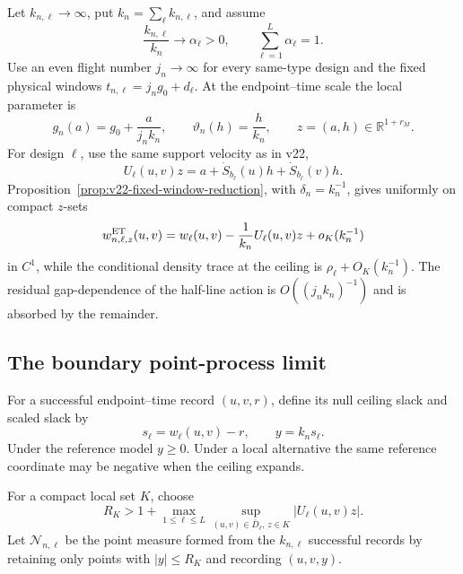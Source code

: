 Let \(k_{n,\ell}\to\infty\), put \(k_n=\sum_\ell k_{n,\ell}\), and assume
\begin{equation}\label{eq:v23-et-design-proportions}
 \frac{k_{n,\ell}}{k_n}\longrightarrow\alpha_\ell>0,
 \qquad \sum_{\ell=1}^L\alpha_\ell=1.
\end{equation}
Use an even flight number \(j_n\to\infty\) for every same-type design and the
fixed physical windows \(t_{n,\ell}=j_ng_0+d_\ell\).  At the endpoint--time
scale the local parameter is
\begin{equation}\label{eq:v23-et-local-parameter}
 g_n(a)=g_0+\frac{a}{j_nk_n},
 \qquad
 \vartheta_n(h)=\frac{h}{k_n},
 \qquad z=(a,h)\in\mathbb R^{1+r_M}.
\end{equation}
For design \(\ell\), use the same support velocity as in v22,
\begin{equation}\label{eq:v23-et-support-velocity}
 U_\ell(u,v)z
 =a+\dot S_{b_\ell}(u)h+\dot S_{b_\ell}(v)h.
\end{equation}
Proposition~\ref{prop:v22-fixed-window-reduction}, with
\(\delta_n=k_n^{-1}\), gives uniformly on compact \(z\)-sets
\begin{equation}\label{eq:v23-et-ceiling-expansion}
 w^{\rm ET}_{n,\ell,z}(u,v)
 =w_\ell(u,v)-\frac1{k_n}U_\ell(u,v)z
   +o_K(k_n^{-1})
\end{equation}
in \(C^1\), while the conditional density trace at the ceiling is
\(\rho_\ell+O_K(k_n^{-1})\).  The residual gap-dependence of the half-line
action is \(O((j_nk_n)^{-1})\) and is absorbed by the remainder.

\subsection{The boundary point-process limit}

For a successful endpoint--time record \((u,v,r)\), define its null ceiling
slack and scaled slack by
\[
 s_\ell=w_\ell(u,v)-r,\qquad y=k_ns_\ell.
\]
Under the reference model \(y\ge0\).  Under a local alternative the same
reference coordinate may be negative when the ceiling expands.

For a compact local set \(K\), choose
\begin{equation}\label{eq:v23-et-RK}
 R_K>1+\max_{1\le\ell\le L}
 \sup_{(u,v)\in\overline D_\ell,\,z\in K}|U_\ell(u,v)z|.
\end{equation}
Let \(\mathcal N_{n,\ell}\) be the point measure formed from the
\(k_{n,\ell}\) successful records by retaining only points with
\(|y|\le R_K\) and recording \((u,v,y)\).

